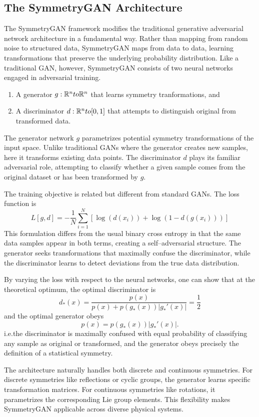     \subsection{The SymmetryGAN Architecture}
    The SymmetryGAN framework modifies the traditional generative adversarial network architecture in a fundamental way.
    Rather than mapping from random noise to structured data, SymmetryGAN maps from data to data, learning transformations that preserve the underlying probability distribution.
    Like a traditional GAN, however, SymmetryGAN consists of two neural networks engaged in adversarial training.
    \begin{enumerate}
        \item A generator \(g: \mathbb{R}^n to \mathbb{R}^n\) that learns symmetry tranformations, and
        \item A discriminator \(d: \mathbb{R}^n to [0, 1]\) that attempts to distinguish original from transformed data.
    \end{enumerate}
    The generator network \(g\) parametrizes potential symmetry transformations of the input space.
    Unlike traditional GANs where the generator creates new samples, here it transforms existing data points.
    The discriminator \(d\) plays its familiar adversarial role, attempting to classify whether a given sample comes from the original dataset or has been transformed by \(g\).

    The training objective is related but different from standard GANs.
    The loss function is
    \[
        L[g,d] = -\frac{1}{N}\sum_{i=1}^{N}\left[\log(d(x_i)) + \log(1-d(g(x_i)))\right]
    \]
    This formulation differs from the usual binary cross entropy in that the same data samples appear in both terms, creating a self--adversarial structure.
    The generator seeks transformations that maximally confuse the discriminator, while the discriminator learns to detect deviations from the true data distribution.

    By varying the loss with respect to the neural networks, one can show that at the theoretical optimum, the optimal discriminator is
    \[
        d_*(x) = \frac{p(x)}{p(x) + p(g_*(x))|g_*'(x)|} = \frac{1}{2}
    \]
    and the optimal generator obeys
    \[
        p(x) = p(g_*(x))|g_*'(x)|.
    \]
    i.e.the discriminator is maximally confused with equal probability of classifying any sample as original or transformed, and the generator obeys precisely the definition of a statistical symmetry.

    The architecture naturally handles both discrete and continuous symmetries.
    For discrete symmetries like reflections or cyclic groups, the generator learns specific transformation matrices.
    For continuous symmetries like rotations, it parametrizes the corresponding Lie group elements.
    This flexibility makes SymmetryGAN applicable across diverse physical systems.

